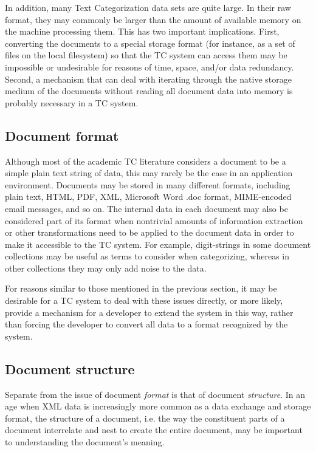 In addition, many Text Categorization data sets are quite large.  In
their raw format, they may commonly be larger than the amount of
available memory on the machine processing them.  This has two
important implications.  First, converting the documents to a special
storage format (for instance, as a set of files on the local
filesystem) so that the TC system can access them may be impossible or
undesirable for reasons of time, space, and/or data redundancy.
Second, a mechanism that can deal with iterating through the native
storage medium of the documents without reading all document data into
memory is probably necessary in a TC system.

\subsection{Document format}
\label{Document format}

Although most of the academic TC literature considers a document to be
a simple plain text string of data, this may rarely be the case in an
application environment.  Documents may be stored in many different
formats, including plain text, HTML, PDF, XML, Microsoft Word .doc
format, MIME-encoded email messages, and so on.  The internal data in
each document may also be considered part of its format when
nontrivial amounts of information extraction or other transformations
need to be applied to the document data in order to make it accessible
to the TC system.  For example, digit-strings in some document
collections may be useful as terms to consider when categorizing,
whereas in other collections they may only add noise to the data.

For reasons similar to those mentioned in the previous section, it may
be desirable for a TC system to deal with these issues directly, or
more likely, provide a mechanism for a developer to extend the system
in this way, rather than forcing the developer to convert all data to
a format recognized by the system.

\subsection{Document structure}

Separate from the issue of document \emph{format} is that of document
\emph{structure}.  In an age when XML data is increasingly more common
as a data exchange and storage format, the structure of a document,
i.e. the way the constituent parts of a document interrelate and nest
to create the entire document, may be important to understanding the
document's meaning.

